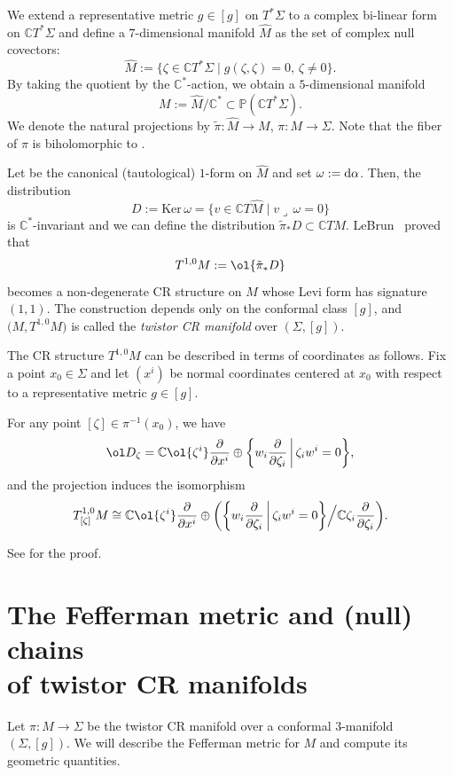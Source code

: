 We extend a representative metric $g\in[g]$ on $T^*\Sigma$ to a complex bi-linear form on $\mathbb{C}T^*\Sigma$ and define a $7$-dimensional manifold $\hat M$ as the set of complex null covectors:
\[
\hat M:=\{\zeta\in\mathbb{C}T^*\Sigma\mid g(\zeta, \zeta)=0,\, \zeta\neq0\}.
\]
By taking the quotient by the $\mathbb{C}^*$-action, we obtain a $5$-dimensional manifold
\[
M:=\hat M/\mathbb{C}^*\subset \mathbb{P}(\mathbb{C}T^*\Sigma).
\]
We denote the natural projections by $\tilde\pi\colon \hat M\to M$, $\pi\colon M\to \Sigma$. Note that the fiber of $\pi$ is biholomorphic to .

Let
 be the canonical (tautological) $1$-form on
$\hat M$ and set $\omega:={\rm d}\alpha$. Then, the distribution
\[
 D:=\textrm{Ker}\, \omega=\bigl\{v\in \mathbb{C}T\hat M\mid v\lrcorner\, \omega=0\bigr\}
\]
is $\mathbb{C}^*$-invariant and we can define the distribution $\tilde\pi_* D\subset \mathbb{C}TM$. LeBrun~\cite{LeB} proved that
\[
T^{1, 0}M:=\ol{\tilde\pi_* D}
\]
becomes a non-degenerate CR structure on $M$ whose Levi form has signature $(1, 1)$. The construction depends only on the conformal class $[g]$, and $\bigl(M, T^{1, 0}M\bigr)$ is called the {\it twistor CR manifold} over $(\Sigma, [g])$.

The CR structure $T^{1, 0}M$ can be described in terms of coordinates as follows.
Fix a point $x_0\in \Sigma$ and let $(x^i)$ be normal coordinates centered at $x_0$ with respect to a representative metric $g\in[g]$.
\begin{Proposition}\label{D}
For any point $[\zeta]\in \pi^{-1}(x_0)$, we have
\[
\ol D_{\zeta}=\mathbb{C}\ol{\zeta^i}\frac{\partial}{\partial x^i}\oplus \biggl\{ w_i\frac{\partial}{\partial \zeta_i} \, \bigg|\, \zeta_i w^i=0\biggr\},
\]
and the projection  induces the isomorphism
\[
T^{1, 0}_{[\zeta]} M\cong\mathbb{C}\ol{\zeta^i}\frac{\partial}{\partial x^i}\oplus \biggl(\biggl\{ w_i\frac{\partial}{\partial \zeta_i}\, \bigg|\, \zeta_i w^i=0\biggr\}\Big/\mathbb{C}\zeta_i\frac{\partial}{\partial \zeta_i}\biggr).
\]
\end{Proposition}
See \cite[Proposition 6.1]{Mar} for the proof.

\section[The Fefferman metric and (null) chains of twistor CR manifolds]{The Fefferman metric and (null) chains\\ of twistor CR manifolds}\label{Fefferman-twistor-CR}
Let $\pi\colon M\to \Sigma$ be the twistor CR manifold over a conformal $3$-manifold $(\Sigma, [g])$. We will describe the Fefferman metric for $M$ and compute its geometric quantities.


